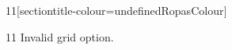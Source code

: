 \documentclass[paper=A4]{ropas-poster}
\begin{document}
\begin{postergrid}{1}{1}[sectiontitle-colour=undefinedRopasColour]
\begin{posterblock}{1}{1}
Invalid grid option.
\end{posterblock}
\end{postergrid}
\end{document}
